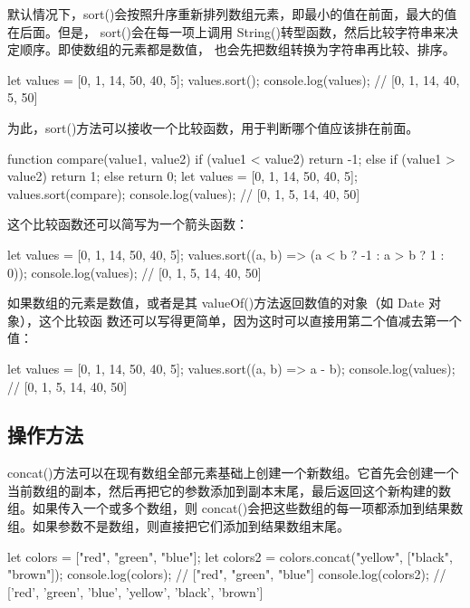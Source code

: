 默认情况下，sort()会按照升序重新排列数组元素，即最小的值在前面，最大的值在后面。但是，
sort()会在每一项上调用 String()转型函数，然后比较字符串来决定顺序。即使数组的元素都是数值，
也会先把数组转换为字符串再比较、排序。

\begin{js}
    let values = [0, 1, 14, 50, 40, 5];
    values.sort();
    console.log(values); // [0, 1, 14, 40, 5, 50]
\end{js}

为此，sort()方法可以接收一个比较函数，用于判断哪个值应该排在前面。

\begin{js}
    function compare(value1, value2) {
            if (value1 < value2) {
                    return -1;
                } else if (value1 > value2) {
                    return 1;
                } else {
                    return 0;
                }
        }
    let values = [0, 1, 14, 50, 40, 5];
    values.sort(compare);
    console.log(values); // [0, 1, 5, 14, 40, 50]
\end{js}

这个比较函数还可以简写为一个箭头函数：
\begin{js}
    let values = [0, 1, 14, 50, 40, 5];
    values.sort((a, b) => (a < b ? -1 : a > b ? 1 : 0));
    console.log(values); // [0, 1, 5, 14, 40, 50]
\end{js}

如果数组的元素是数值，或者是其 valueOf()方法返回数值的对象（如 Date 对象），这个比较函
数还可以写得更简单，因为这时可以直接用第二个值减去第一个值：

\begin{js}
    let values = [0, 1, 14, 50, 40, 5];
    values.sort((a, b) => a - b);
    console.log(values); // [0, 1, 5, 14, 40, 50]
\end{js}
\subsection{操作方法}
concat()方法可以在现有数组全部元素基础上创建一个新数组。它首先会创建一个当前数组的副本，然后再把它的参数添加到副本末尾，最后返回这个新构建的数组。如果传入一个或多个数组，则 concat()会把这些数组的每一项都添加到结果数组。如果参数不是数组，则直接把它们添加到结果数组末尾。
\begin{js}
    let colors = ["red", "green", "blue"];
    let colors2 = colors.concat("yellow", ["black", "brown"]);
    console.log(colors); // ["red", "green", "blue"]
    console.log(colors2); // ['red', 'green', 'blue', 'yellow', 'black', 'brown']
\end{js}

